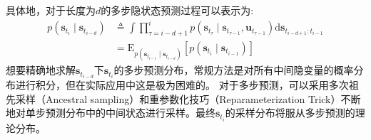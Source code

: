 具体地，对于长度为$d$的多步隐状态预测过程可以表示为:
\begin{equation}
\begin{aligned}
p\left(\boldsymbol{s}_{t_i} \mid \boldsymbol{s}_{t_{i-d}}\right) & \triangleq \int \prod_{\tau=i-d+1}^{i} p\left(\boldsymbol{s}_{t_\tau} \mid \boldsymbol{s}_{t_{\tau-1}},\boldsymbol{u}_{t_{\tau-1}}\right) \mathrm{d} \boldsymbol{s}_{t_{i-d+1}: t_{i-1}} \\
&=\mathrm{E}_{p\left(\boldsymbol{s}_{t_{i-1}} \mid \boldsymbol{s}_{t_{i-d}}\right)}\left[p\left(\boldsymbol{s}_{t_i} \mid \boldsymbol{s}_{t_{i-1}}\right)\right]
\end{aligned}
\label{equ:multistep}
\end{equation}
想要精确地求解$\boldsymbol{s}_{t_{i-d}} $下$\boldsymbol{s}_{t_{i}}$的多步预测分布，常规方法是对所有中间隐变量的概率分布进行积分，但在实际应用中这是极为困难的。
对于多步预测，可以采用多次祖先采样（Ancestral sampling）和重参数化技巧（Reparameterization Trick）不断地对单步预测分布中的中间状态进行采样。最终$\boldsymbol{s}_{t_{i}}$的采样分布将服从多步预测的理论分布。

